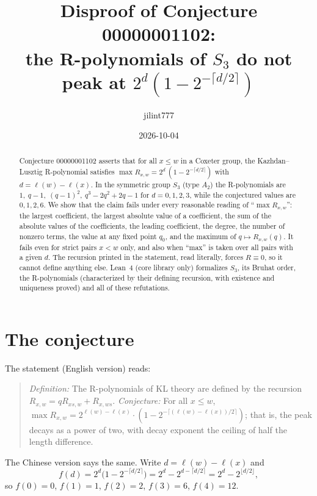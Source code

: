 \documentclass[11pt]{article}
\title{Disproof of Conjecture 00000001102:\\
the R-polynomials of $S_3$ do not peak at $2^{d}(1-2^{-\lceil d/2\rceil})$}
\author{jilint777}
\date{2026-10-04}
\theoremstyle{remark}
\begin{document}
\sloppy
\maketitle

\begin{abstract}
Conjecture 00000001102 asserts that for all $x\le w$ in a Coxeter group, the
Kazhdan--Lusztig R-polynomial satisfies
$\max R_{x,w}=2^{d}\,(1-2^{-\lceil d/2\rceil})$ with $d=\ell(w)-\ell(x)$.
In the symmetric group $S_3$ (type $A_2$) the R-polynomials are
$1,\ q-1,\ (q-1)^2,\ q^3-2q^2+2q-1$ for $d=0,1,2,3$, while the conjectured values
are $0,1,2,6$. We show that the claim fails under every reasonable reading of
``$\max R_{x,w}$'': the largest coefficient, the largest absolute value of a
coefficient, the sum of the absolute values of the coefficients, the leading
coefficient, the degree, the number of nonzero terms, the value at any fixed point
$q_0$, and the maximum of $q\mapsto R_{x,w}(q)$. It fails even for strict pairs
$x<w$ only, and also when ``max'' is taken over all pairs with a given $d$.
The recursion printed in the statement, read literally, forces $R\equiv0$, so it
cannot define anything else. Lean~4 (core library only) formalizes $S_3$, its
Bruhat order, the R-polynomials (characterized by their defining recursion,
with existence and uniqueness proved) and all of these refutations.
\end{abstract}

\section{The conjecture}

The statement (English version) reads:
\begin{quote}
\emph{Definition:} The R-polynomials of KL theory are defined by the recursion
$R_{x,w}=qR_{xs,w}+R_{x,ws}$. \emph{Conjecture:} For all $x\le w$,
$\max R_{x,w}=2^{\ell(w)-\ell(x)}\cdot(1-2^{-\lceil(\ell(w)-\ell(x))/2\rceil})$;
that is, the peak decays as a power of two, with decay exponent the ceiling of
half the length difference.
\end{quote}
The Chinese version says the same. Write $d=\ell(w)-\ell(x)$ and
\[
f(d)=2^{d}\bigl(1-2^{-\lceil d/2\rceil}\bigr)=2^d-2^{d-\lceil d/2\rceil}=2^d-2^{\lfloor d/2\rfloor},
\]
so $f(0)=0$, $f(1)=1$, $f(2)=2$, $f(3)=6$, $f(4)=12$.
\end{document}
